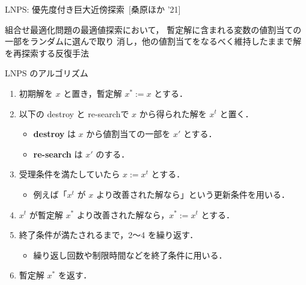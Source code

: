 \documentclass[11pt,dvipdfmx]{beamer}
\begin{document}
\begin{frame}{LNPS: 優先度付き巨大近傍探索~[桑原ほか '21]}
  \begin{alertblock}{}\centering
    組合せ最適化問題の最適値探索において，
    暫定解に含まれる変数の値割当ての一部をランダムに選んで取り
    消し，他の値割当てをなるべく維持したままで解を再探索する反復手法
  \end{alertblock}
  \pause
  \begin{block}{\small LNPS のアルゴリズム}
    \begin{enumerate}
      \compress
      \item 初期解を $x$ と置き，暫定解 $x^{*} := x$ とする．
      \item 以下の destroy と re-searchで $x$ から得られた解を $x^{t}$ と置く．
      \begin{itemize}
        \compress
        \item \alert{\bf destroy} は $x$ から値割当ての一部を $x'$ とする．
        \item \alert{\bf re-search} は $x'$ のする．
      \end{itemize}
      \item 受理条件を満たしていたら $x := x^{t}$ とする．
      \begin{itemize}
        \item 例えば「$x^{t}$ が $x$ より改善された解なら」という更新条件を用いる．
      \end{itemize}
      \item $x^{t}$ が暫定解 $x^{*}$ より改善された解なら，$x^{*} := x^{t}$ とする．
      \item 終了条件が満たされるまで，2〜4 を繰り返す．
      \begin{itemize}
        \item 繰り返し回数や制限時間などを終了条件に用いる．
      \end{itemize}
      \item 暫定解 $x^{*}$ を返す．
    \end{enumerate}
  \end{block}
\end{frame}
\end{document}
